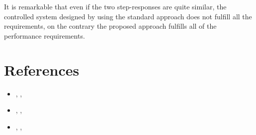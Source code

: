 It is remarkable that even if the two step-responses are quite similar, the controlled system designed by using the standard approach does not fulfill all the requirements, on the contrary the proposed approach fulfills all of the performance requirements.

\section*{References}
\begin{itemize}
    \itemsep-0.3em
    \item[\Large{\ding{45}}]  , \textit{}, 
    \item[\Large{\ding{45}}]  , \textit{}, 
    \item[\Large{\ding{45}}]  , \textit{}, 
\end{itemize}
